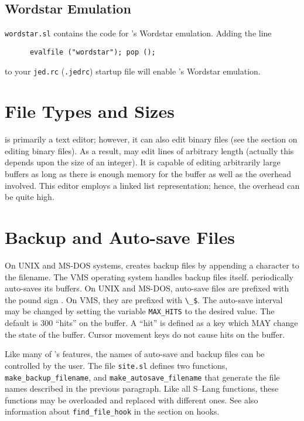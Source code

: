 \subsection{Wordstar Emulation}

  \verb|wordstar.sl| contains the \slang{} code for \jed{}'s Wordstar
  emulation. Adding the line
\begin{verbatim}
      evalfile ("wordstar"); pop ();
\end{verbatim}
  to your \verb|jed.rc| (\verb|.jedrc|) startup file will enable \jed{}'s
  Wordstar emulation.


\section{File Types and Sizes}

  \jed{} is primarily a text editor; however, it can also edit binary files
  (see the section on editing binary files).  As a result, \jed{} may edit
  lines of arbitrary length (actually this depends upon the size of an
  integer).  It is capable of editing arbitrarily large buffers as long as
  there is enough memory for the buffer as well as the overhead involved.
  This editor employs a linked list representation; hence, the overhead can
  be quite high.

\section{Backup and Auto-save Files}

  On UNIX and MS-DOS systems, \jed{} creates backup files by appending a \var{~}
  character to the filename.  The VMS operating system handles backup files
  itself.  \jed{} periodically auto-saves its buffers.  On UNIX and MS-DOS,
  auto-save files are prefixed with the pound sign \var{\#}.  On VMS, they are
  prefixed with \verb|\_$|.  The auto-save interval may be changed by setting
  the variable \verb|MAX_HITS| to the desired value. The default is 300
  ``hits'' on the buffer. A ``hit'' is defined as a key which MAY change the
  state of the buffer. Cursor movement keys do not cause hits on the buffer.

  Like many of \jed{}'s features, the names of auto-save and backup files can be
  controlled by the user.  The file \verb|site.sl| defines two functions,
  \verb|make_backup_filename|, and \verb|make_autosave_filename| that
  generate the file names described in the previous paragraph.  Like all
  S--Lang functions, these functions may be overloaded and replaced with
  different ones.  See also information about \verb|find_file_hook| in the
  section on hooks.

